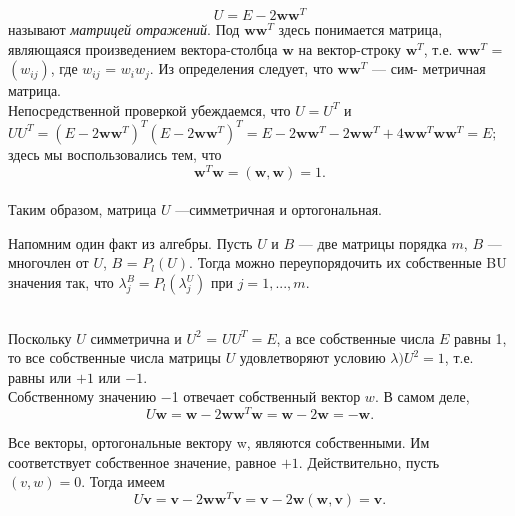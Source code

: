 \documentclass[a4paper, twoside, 12pt]{article}
\begin{document}
\[
U = E - 2\textbf{w}\textbf{w}^T
\]
называют \textit{матрицей отражений}. Под $\textbf{ww}^T$ здесь понимается матрица, являющаяся произведением вектора-столбца $\textbf{w}$ на вектор-строку $\textbf{w}^T$, т.е. $\textbf{w}\textbf{w}^T$ = $(w_{ij})$, где $w_{ij}$ = $w_{i}w_{j}$. Из определения следует, что $\textbf{w}\textbf{w}^T$ — сим- метричная матрица. 
\\ 
\indent Непосредственной проверкой убеждаемся, что $U = U^T$ и
\\
$UU^T = (E - 2\textbf{w}\textbf{w}^T)^T(E - 2\textbf{w}\textbf{w}^T)^T = E - 2\textbf{w}\textbf{w}^T - 2 \textbf{w}\textbf{w}^T +4 \textbf{w}\textbf{w}^T\textbf{w}\textbf{w}^T =E;$
\\
здесь мы воспользовались тем, что
\[\textbf{w}^T\textbf{w} = (\textbf{w},\textbf{w}) = 1.\]
\\
Таким образом, матрица $U$ —симметричная и ортогональная.
\\
\begin{adjustwidth}{1cm}{0cm}

\begin{small}
Напомним один факт из алгебры. Пусть $U$ и $B$ — две матрицы порядка $m$, $B$ —
многочлен от $U$, $B$ = $P_{l}(U)$. Тогда можно переупорядочить их собственные BU
значения так, что $\lambda_{j}^B = P_{l}(\lambda_{j}^U)$ при $j = 1,..., m$.

\end{small}

\end{adjustwidth}
\\
\indent Поскольку $U$ симметрична и $U^2$ = $UU^T = E$, а все собственные числа $E$ равны 1, то все собственные числа матрицы $U$ удовлетворяют условию $\lambda){U}^2 = 1$, т.е. равны или $+1$ или $-1$.
\\ \indent
Собственному значению −1 отвечает собственный вектор $w$. В самом
деле,
\[
U\textbf{w} = \textbf{w} - 2\textbf{w}\textbf{w}^T\textbf{w}=\textbf{w} - 2 \textbf{w} = - \textbf{w}.
\]

\indent
Все векторы, ортогональные вектору w, являются собственными. Им соответствует собственное значение, равное $+1$. Действительно, пусть $(v, w) = 0$. Тогда имеем
\[
U\textbf{v} = \textbf{v} - 2\textbf{w}\textbf{w}^T\textbf{v}=\textbf{v} - 2 \textbf{w}(\textbf{w}, \textbf{v}) =  \textbf{v}.
\]
\end{document}
